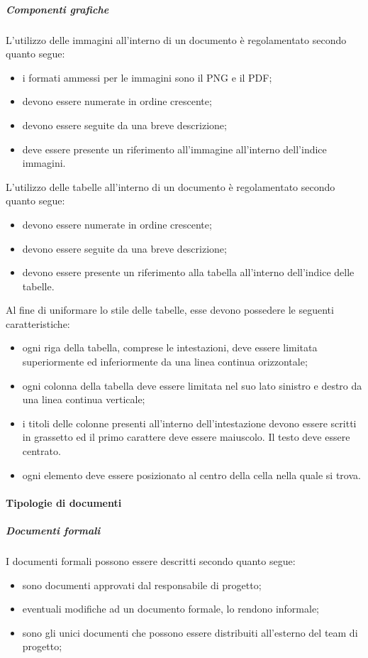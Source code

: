 \documentclass[../NormeProgetto.tex]{subfiles}
\begin{document}
		\subparagraph{Componenti grafiche}
			L'utilizzo delle immagini all'interno di un documento è regolamentato secondo quanto segue:
			\begin{itemize}
				\item i formati ammessi per le immagini sono il PNG e il PDF;
				\item devono essere numerate in ordine crescente;
				\item devono essere seguite da una breve descrizione;
				\item deve essere presente un riferimento all'immagine all'interno dell'indice immagini.
			\end{itemize}
			L'utilizzo delle tabelle all'interno di un documento è regolamentato secondo quanto segue:
			\begin{itemize}
				\item devono essere numerate in ordine crescente;
				\item devono essere seguite da una breve descrizione;
				\item devono essere presente un riferimento alla tabella all'interno dell'indice delle tabelle.
			\end{itemize}
			
			Al fine di uniformare lo stile delle tabelle, esse devono possedere le seguenti caratteristiche:
			\begin{itemize}
				\item ogni riga della tabella, comprese le intestazioni, deve essere limitata superiormente ed inferiormente da una linea continua orizzontale;
				\item ogni colonna della tabella deve essere limitata nel suo lato sinistro e destro da una linea continua verticale;
				\item i titoli delle colonne presenti all'interno dell'intestazione devono essere scritti in grassetto ed il primo carattere deve essere maiuscolo. Il testo deve essere centrato.
				\item ogni elemento deve essere posizionato al centro della cella nella quale si trova.
			\end{itemize}				
			
	\paragraph{Tipologie di documenti}
		\subparagraph{Documenti formali}
		I documenti formali possono essere descritti secondo quanto segue:
		\begin{itemize}
			\item sono documenti approvati dal responsabile di progetto;
			\item eventuali modifiche ad un documento formale, lo rendono informale;
			\item sono gli unici documenti che possono essere distribuiti all'esterno del team di progetto;
		\end{itemize}
		
\end{document}
